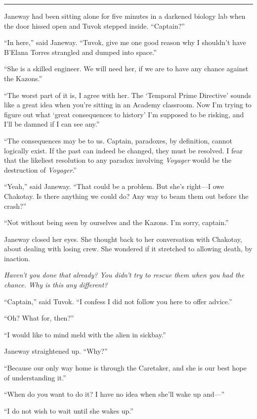 \documentclass[twoside,letterpaper,12pt]{memoir}
\begin{document}
\fancybreak{\rule{3cm}{0.4 pt}} 

Janeway had been sitting alone for five minutes in a darkened biology lab when the door hissed open and Tuvok stepped inside. ``Captain?'' 

``In here,'' said Janeway. ``Tuvok, give me one good reason why I shouldn't have B'Elana Torres strangled and dumped into space.'' 

``She is a skilled engineer. We will need her, if we are to have any chance against the Kazons.'' 

``The worst part of it is, I agree with her. The `Temporal Prime Directive' sounds like a great idea when you're sitting in an Academy classroom. Now I'm trying to figure out what `great consequences to history' I'm supposed to be risking, and I'll be damned if I can see any.'' 

``The consequences may be to us. Captain, paradoxes, by definition, cannot logically exist. If the past can indeed be changed, they must be resolved. I fear that the likeliest resolution to any paradox involving \textit{Voyager} would be the destruction of \textit{Voyager}.'' 

``Yeah,'' said Janeway. ``That could be a problem. But she's right---I owe Chakotay. Is there anything we could do? Any way to beam them out before the crash?'' 

``Not without being seen by ourselves and the Kazons. I'm sorry, captain.'' 

Janeway closed her eyes. She thought back to her conversation with Chakotay, about dealing with losing crew. She wondered if it stretched to allowing death, by inaction. 

\textit{Haven't you done that already? You didn't try to rescue them when you had the chance. Why is this any different?} 

``Captain,'' said Tuvok. ``I confess I did not follow you here to offer advice.'' 

``Oh? What for, then?'' 

``I would like to mind meld with the alien in sickbay.'' 

Janeway straightened up. ``Why?'' 

``Because our only way home is through the Caretaker, and she is our best hope of understanding it.'' 

``When do you want to do it? I have no idea when she'll wake up and---'' 

``I do not wish to wait until she wakes up.'' 
\end{document}
